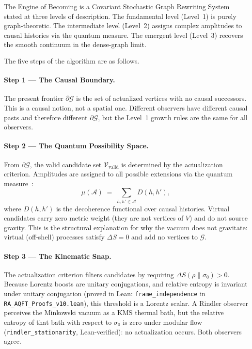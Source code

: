 \documentclass[11pt,twocolumn]{article}
\theoremstyle{plain}
\theoremstyle{remark}
\newcommand{\DAG}{\mathcal{G}}
\newcommand{\partialG}{\partial\DAG}
\newcommand{\Vvalid}{\mathcal{V}_{\mathrm{valid}}}
\begin{document}
The Engine of Becoming is a Covariant Stochastic Graph Rewriting
System stated at three levels of description.
The fundamental level (Level~1) is purely graph-theoretic.
The intermediate level (Level~2) assigns complex amplitudes to
causal histories via the quantum measure.
The emergent level (Level~3) recovers the smooth continuum in the
dense-graph limit.

The five steps of the algorithm are as follows.

\paragraph{Step 1 --- The Causal Boundary.}
The present frontier $\partialG$ is the set of actualized vertices
with no causal successors.
This is a causal notion, not a spatial one.
Different observers have different causal pasts and therefore different
$\partialG$, but the Level~1 growth rules are the same for all
observers.

\paragraph{Step 2 --- The Quantum Possibility Space.}
From $\partialG$, the valid candidate set $\Vvalid$ is determined
by the actualization criterion.
Amplitudes are assigned to all possible extensions via the quantum
measure~\cite{Sorkin1994}:
\begin{equation}
  \mu(\mathcal{A}) \;=\; \sum_{h,h'\in\mathcal{A}} D(h,h'),
  \label{eq:qm}
\end{equation}
where $D(h,h')$ is the decoherence functional over causal histories.
Virtual candidates carry zero metric weight (they are not vertices
of $V$) and do not source gravity.
This is the structural explanation for why the vacuum does not
gravitate: virtual (off-shell) processes satisfy $\Delta S = 0$
and add no vertices to $\DAG$.

\paragraph{Step 3 --- The Kinematic Snap.}
The actualization criterion filters candidates by requiring
$\Delta S(\rho\|\sigma_0) > 0$.
Because Lorentz boosts are unitary conjugations, and relative entropy
is invariant under unitary conjugation (proved in Lean:
\texttt{frame\_independence} in \texttt{RA\_AQFT\_Proofs\_v10.lean}),
this threshold is a Lorentz scalar.
A Rindler observer perceives the Minkowski vacuum as a KMS thermal
bath, but the relative entropy of that bath with respect to $\sigma_0$
is zero under modular flow (\texttt{rindler\_stationarity}, Lean-verified):
no actualization occurs.
Both observers agree.
\end{document}
